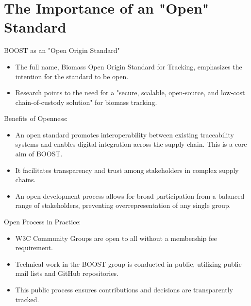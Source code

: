 \documentclass[presentation]{beamer}
\begin{document}
\section{The Importance of an "Open" Standard}
\label{the-importance-of-an-open-standard}
\begin{frame}[label={sec:orgc6a1f90}]{BOOST as an "Open Origin Standard"}
\begin{itemize}
\item The full name, Biomass \alert{Open} Origin Standard for Tracking, emphasizes the intention for the standard to be open.
\item Research points to the need for a "secure, scalable, \alert{open-source}, and low-cost chain-of-custody solution" for biomass tracking.
\end{itemize}
\end{frame}
\begin{frame}[label={sec:orgad945f6}]{Benefits of Openness:}
\begin{itemize}
\item An open standard promotes \alert{interoperability} between existing traceability systems and enables digital integration across the supply chain. This is a core aim of BOOST.
\item It facilitates \alert{transparency} and \alert{trust} among stakeholders in complex supply chains.
\item An open development process allows for \alert{broad participation} from a balanced range of stakeholders, preventing overrepresentation of any single group.
\end{itemize}
\end{frame}
\begin{frame}[label={sec:orgf2ca1fe}]{Open Process in Practice:}
\begin{itemize}
\item W3C Community Groups are \alert{open to all} without a membership fee requirement.
\item Technical work in the BOOST group is conducted \alert{in public}, utilizing public mail lists and GitHub repositories.
\item This public process ensures contributions and decisions are transparently tracked.
\end{itemize}
\end{frame}
\end{document}
